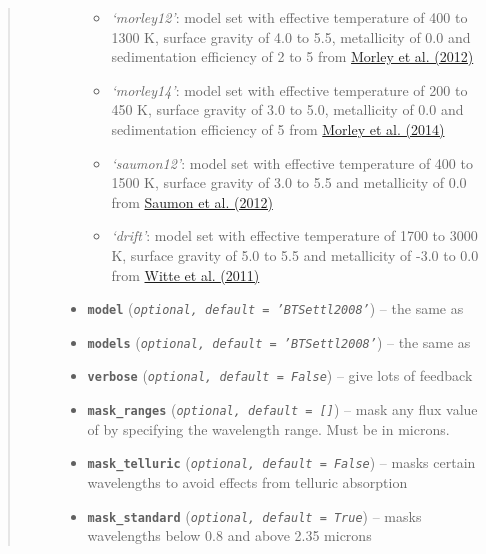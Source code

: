 \documentclass[letterpaper,10pt,english]{sphinxmanual}
\begin{document}
\begin{fulllineitems}
\begin{quote}
\begin{description}
\begin{itemize}
\begin{itemize}
\item {} 
\emph{`morley12'}: model set with effective temperature of 400 to 1300 K, surface gravity of 4.0 to 5.5, metallicity of 0.0
and sedimentation efficiency of 2 to 5 from \href{http://adsabs.harvard.edu/abs/2012ApJ...756..172M}{Morley et al. (2012)}

\item {} 
\emph{`morley14'}: model set with effective temperature of 200 to 450 K, surface gravity of 3.0 to 5.0, metallicity of 0.0
and sedimentation efficiency of 5 from \href{http://adsabs.harvard.edu/abs/2014ApJ...787...78M}{Morley et al. (2014)}

\item {} 
\emph{`saumon12'}: model set with effective temperature of 400 to 1500 K, surface gravity of 3.0 to 5.5 and metallicity of 0.0
from \href{http://adsabs.harvard.edu/abs/2012ApJ...750...74S}{Saumon et al. (2012)}

\item {} 
\emph{`drift'}: model set with effective temperature of 1700 to 3000 K, surface gravity of 5.0 to 5.5 and metallicity of -3.0 to 0.0
from \href{http://adsabs.harvard.edu/abs/2011A\%26A...529A..44W}{Witte et al. (2011)}

\end{itemize}


\item {} 
\textbf{\texttt{model}} (\emph{\texttt{optional, default = 'BTSettl2008'}}) -- the same as 

\item {} 
\textbf{\texttt{models}} (\emph{\texttt{optional, default = 'BTSettl2008'}}) -- the same as 

\item {} 
\textbf{\texttt{verbose}} (\emph{\texttt{optional, default = False}}) -- give lots of feedback

\item {} 
\textbf{\texttt{mask\_ranges}} (\emph{\texttt{optional, default = {[}{]}}}) -- mask any flux value of  by specifying the wavelength range.
Must be in microns.

\item {} 
\textbf{\texttt{mask\_telluric}} (\emph{\texttt{optional, default = False}}) -- masks certain wavelengths to avoid effects from telluric absorption

\item {} 
\textbf{\texttt{mask\_standard}} (\emph{\texttt{optional, default = True}}) -- masks wavelengths below 0.8 and above 2.35 microns


\end{itemize}
\end{description}
\end{quote}
\end{fulllineitems}
\end{document}
